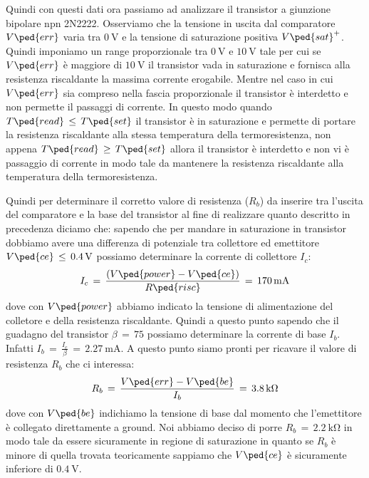 Quindi con questi dati ora passiamo ad analizzare il transistor a giunzione bipolare npn 2N2222. Osserviamo che la tensione in uscita dal comparatore $V\ped{err}$ varia tra $\SI{0}{\volt}$ e la tensione di saturazione positiva $V\ped{sat}^+$. Quindi imponiamo un range proporzionale tra $\SI{0}{\volt}$ e $\SI{+10}{\volt}$ tale per cui se $V\ped{err}$ è maggiore di $\SI{+10}{\volt}$ il transistor vada in saturazione e fornisca alla resistenza riscaldante la massima corrente erogabile. Mentre nel caso in cui $V\ped{err}$ sia compreso nella fascia proporzionale il transistor è interdetto e non permette il passaggi di corrente. In questo modo quando $T\ped{read}\,\leq\,T\ped{set}$ il transistor è in saturazione e permette di portare la resistenza riscaldante alla stessa temperatura della termoresistenza, non appena $T\ped{read}\,\geq\,T\ped{set}$ allora il transistor è interdetto e non vi è passaggio di corrente in modo tale da mantenere la resistenza riscaldante alla temperatura della termoresistenza.

Quindi per determinare il corretto valore di resistenza ($R_b$) da inserire tra l'uscita del comparatore e la base del transistor al fine di realizzare quanto descritto in precedenza diciamo che: sapendo che per mandare in saturazione in transistor dobbiamo avere una differenza di potenziale tra collettore ed emettitore $V\ped{ce}\,\leq\,\SI{0.4}{\volt}$ possiamo determinare la corrente di collettore $I_c$:
\begin{equation}
	I_c\,=\,\frac{(V\ped{power} - V\ped{ce})}{R\ped{risc}}\,=\,\SI{170}{\milli\ampere}
\end{equation}
dove con $V\ped{power}$ abbiamo indicato la tensione di alimentazione del colletore e della resistenza riscaldante. Quindi a questo punto sapendo che il guadagno del transistor $\beta\,=\,75$ possiamo determinare la corrente di base $I_b$. Infatti $I_b\,=\,\frac{I_c}{\beta}\,=\,\SI{2.27}{\milli\ampere}$. A questo punto siamo pronti per ricavare il valore di resistenza $R_b$ che ci interessa:
\begin{equation}
	R_b\,=\,\frac{V\ped{err} - V\ped{be}}{I_b}\,=\,\SI{3.8}{\kilo\ohm}
\end{equation}
dove con $V\ped{be}$ indichiamo la tensione di base dal momento che l'emettitore è collegato direttamente a ground.
Noi abbiamo deciso di porre $R_b\,=\,\SI{2.2}{\kilo\ohm}$ in modo tale da essere sicuramente in regione di saturazione in quanto se $R_b$ è minore di quella trovata teoricamente sappiamo che $V\ped{ce}$ è sicuramente inferiore di $\SI{0.4}{\volt}$.

